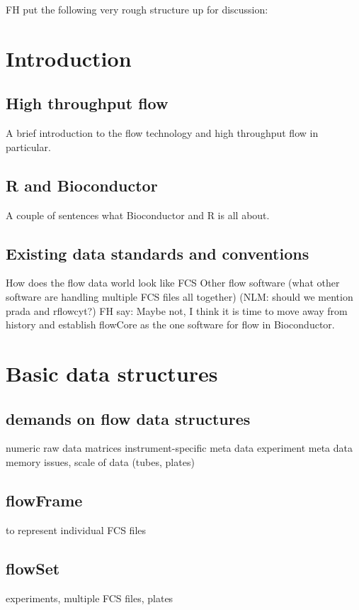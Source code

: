 \documentclass[12pt]{article}
\begin{document}
FH put the following very rough structure up for discussion:

\section{Introduction}

\subsection{High throughput flow}
A brief introduction to the flow technology and high throughput flow
in particular. 

\subsection{R and Bioconductor}
A couple of sentences what Bioconductor and R is all
about.

\subsection{Existing data standards and conventions}
How does the flow data world look like
FCS
Other flow software (what other software are handling multiple FCS files all together)
(NLM: should we mention prada and rflowcyt?) FH say: Maybe not, I
think it is time to move away from history and establish flowCore as
the one software for flow in Bioconductor. 

\section{Basic data structures}

\subsection{demands on flow data structures}
numeric raw data matrices
instrument-specific meta data
experiment meta data
memory issues, scale of data (tubes, plates)

\subsection{flowFrame}
to represent individual FCS files

\subsection{flowSet} 
experiments, multiple FCS files, plates
\end{document}
